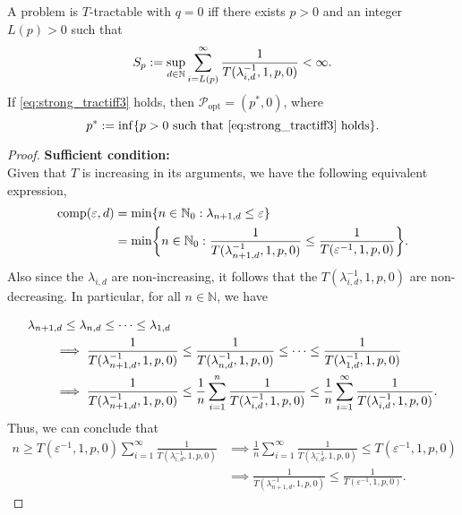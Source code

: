 \documentclass[11pt,a4paper]{article}
\begin{document}
{\begin{theorem}\label{thm_main_strong_tract2} 
A problem is $T$-tractable with $q=0$ iff there exists $p>0$ and an integer $L(p) > 0$ such that
\begin{equation} \label{eq:strong_tractiff3}
     S_p:=\sup_{d \in \mathbb{N}} \sum_{i = L(p)}^\infty \frac{1}{T(\lambda_{i,d}^{-1},1,p,0)} < \infty.
\end{equation}
If \eqref{eq:strong_tractiff3} holds, then $\mathcal{P}_{\text{opt}}=(p^*,0)$, where
\[
 p^* := \inf\{p>0\ \mbox{such that \eqref{eq:strong_tractiff3} holds}\}.
\]
\end{theorem}
\begin{proof}
\textbf{Sufficient condition:}\\
Given that $T$ is increasing in its arguments, we have the following equivalent expression, 
    \begin{align*}
    \operatorname{comp}(\varepsilon, d) &= \min \{n \in \mathbb{N}_{0} : \lambda_{n+1, d} \le \varepsilon\} \\
    &= \min \biggl\{n \in \mathbb{N}_{0} : \frac{1}{T(\lambda_{n+1,d}^{-1},1,p,0)}\le \frac{1}{T(\varepsilon^{-1},1,p,0) }\biggr\}.
\end{align*}
Also since the $\lambda_{i,d}$ are non-increasing, it follows that the $T(\lambda_{i,d}^{-1},1,p,0)$ are non-decreasing. In particular, for all $n\in \mathbb{N}$, we have

\begin{align*}
    \MoveEqLeft{\lambda_{n+1,d} \le \lambda_{n,d} \le \cdots \le \lambda_{1,d}} \\
    & \implies \frac{1}{T(\lambda_{n+1, d}^{-1},1,p,0)} \le \frac{1}{T(\lambda_{n, d}^{-1},1,p,0)} \le \cdots \le \frac{1}{T(\lambda_{1, d}^{-1},1,p,0)} \\
    & \implies \frac{1}{T(\lambda_{n+1, d}^{-1},1,p,0) }
    \le \frac 1n \sum_{i=1}^n  \frac{1}{T(\lambda_{i, d}^{-1},1,p,0) }
    \le \frac 1n \sum_{i=1}^\infty  \frac{1}{T(\lambda_{i, d}^{-1},1,p,0)}.
\end{align*}
Thus, we can conclude that 
\begin{align*}
    n \ge T(\varepsilon^{-1},1,p,0) \sum_{i=1}^\infty \frac{1}{T(\lambda_{i, d}^{-1},1,p,0)}
    & \implies 
\frac 1n \sum_{i=1}^\infty \frac{1}{T(\lambda_{i, d}^{-1},1,p,0) }\le  T(\varepsilon^{-1},1,p,0) \\
   & \implies   \frac{1}{T(\lambda_{n+1, d}^{-1},1,p,0)} \le \frac{1}{T(\varepsilon^{-1},1,p,0)}.
\end{align*}


\end{proof}}
\end{document}
